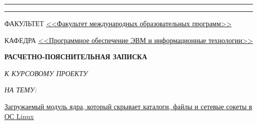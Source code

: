 \begin{titlepage}
    \vspace{-2.4cm}

    \begin{flushleft}
        \rule[-1cm]{\textwidth}{2.5pt}
        \rule{\textwidth}{0.5pt}
    \end{flushleft}

    \begin{flushleft}
        \small
        ФАКУЛЬТЕТ \uline{\hfill<<Факультет международных образовательных программ>>\hfill} \par
        \vspace{0.25cm}
        КАФЕДРА \uline{\hfill<<Программное обеспечение ЭВМ и информационные технологии>>\hfill} \par
    \end{flushleft}

    \vspace{3.5cm}

    {\Large\scshape\bfseries\centering
        РАСЧЕТНО-ПОЯСНИТЕЛЬНАЯ ЗАПИСКА
        \vspace{0.4cm}

        \textit{К КУРСОВОМУ ПРОЕКТУ}
        \vspace{0.4cm}

        \textit{НА ТЕМУ:}

    }
    \vspace{0.75cm}
        \normalsize

        \noindent
        \sloppy\uline{\quad{}Загружаемый модуль ядра, который скрывает каталоги, файлы и сетевые сокеты в ОС Linux\hfill}

        \noindent
        \uline{\hfill{}\hfill}

        \noindent
        \uline{\hfill{}\hfill}

        \noindent
        \uline{\hfill{}\hfill}

        \noindent
        \uline{\hfill{}\hfill}

    \vspace{1.5cm}

    \centering


\end{titlepage}
